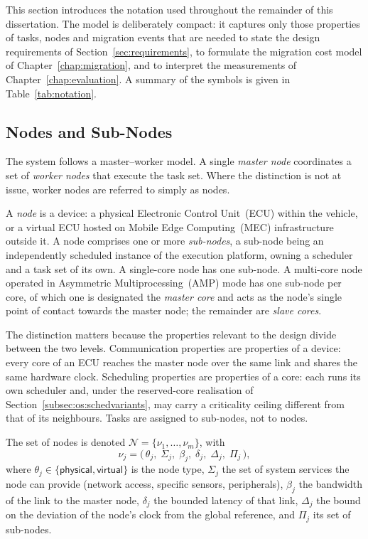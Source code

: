 This section introduces the notation used throughout the remainder of this
dissertation. The model is deliberately compact: it captures only those
properties of tasks, nodes and migration events that are needed to state the
design requirements of Section~\ref{sec:requirements}, to formulate the
migration cost model of Chapter~\ref{chap:migration}, and to interpret the
measurements of Chapter~\ref{chap:evaluation}. A summary of the symbols is
given in Table~\ref{tab:notation}.

\subsection{Nodes and Sub-Nodes}\label{subsec:nodemodel}

The system follows a master--worker model. A single \emph{master node}
coordinates a set of \emph{worker nodes} that execute the task set. Where the
distinction is not at issue, worker nodes are referred to simply as nodes.

A \emph{node} is a device: a physical Electronic Control Unit~(ECU) within the
vehicle, or a virtual ECU hosted on Mobile Edge Computing~(MEC) infrastructure
outside it. A node comprises one or more \emph{sub-nodes}, a sub-node being an
independently scheduled instance of the execution platform, owning a
scheduler and a task set of its own. A single-core node has one sub-node. A
multi-core node operated in Asymmetric Multiprocessing~(AMP) mode has one
sub-node per core, of which one is designated the \emph{master core} and acts
as the node's single point of contact towards the master node; the remainder
are \emph{slave cores}.

The distinction matters because the properties relevant to the design divide
between the two levels. Communication properties are properties of a device:
every core of an ECU reaches the master node over the same link and shares the
same hardware clock. Scheduling properties are properties of a core: each
runs its own scheduler and, under the reserved-core realisation of
Section~\ref{subsec:os:schedvariants}, may carry a criticality ceiling
different from that of its neighbours. Tasks are assigned to sub-nodes, not to
nodes.

The set of nodes is denoted $\mathcal{N} = \{\nu_1, \dots, \nu_m\}$, with
%
\begin{equation}\label{eq:nodemodel}
  \nu_j = \bigl(\,\theta_j,\; \Sigma_j,\; \beta_j,\; \delta_j,\;
                  \Delta_j,\; \Pi_j \,\bigr),
\end{equation}
%
where $\theta_j \in \{\textsf{physical}, \textsf{virtual}\}$ is the node type,
$\Sigma_j$ the set of system services the node can provide (network access,
specific sensors, peripherals), $\beta_j$ the bandwidth of the link to the
master node, $\delta_j$ the bounded latency of that link, $\Delta_j$ the bound
on the deviation of the node's clock from the global reference, and $\Pi_j$
its set of sub-nodes.

